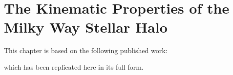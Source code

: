 \chapter{The Kinematic Properties of the Milky Way Stellar Halo}

This chapter is based on the following published work:

\vspace{10pt}
\vspace{10pt}

\noindent which has been replicated here in its full form.



